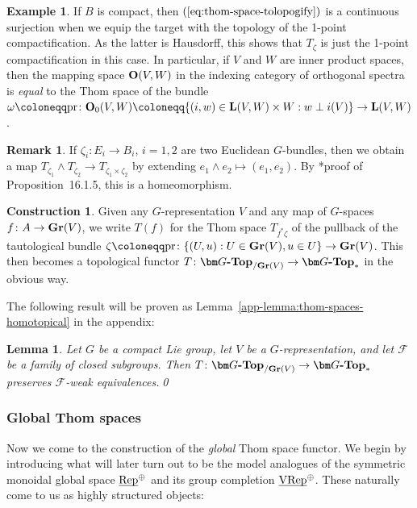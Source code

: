 \documentclass[reqno]{memo-l}
\theoremstyle{mythm}
\newtheorem{lemma}[thm]{Lemma}
\theoremstyle{definition}
\newtheorem{rk}[thm]{Remark}
\newtheorem{constr}[thm]{Construction}
\newtheorem{ex}[thm]{Example}
\numberwithin{equation}{section}
\newcommand{\Ff}{{\mathcal{F}}}
\newcommand{\cat}[1]{\textbf{\textup{#1}}}
\newcommand{\pr}{\textup{pr}}
\newcommand{\ulhelper}[2]{\underline{\setbox0=\hbox{$#1#2$}\dp0=0.4pt \box0\relax}}
\newcommand{\ul}[1]{{\mathpalette\ulhelper{#1}}\hbox{\rule[-2pt]{0pt}{0pt}}}
\let\smashp=\wedge
\newcommand{\VRep}{\textup{VRep}}
\newcommand{\Vect}{\textup{Rep}}
\begin{document}
\begin{ex}\label{ex:thom-space-1pt}
    If $B$ is compact, then $(\ref{eq:thom-space-tolopogify})$ is a continuous surjection when we equip the target with the topology of the 1-point compactification. As the latter is Hausdorff, this shows that $T_\zeta$ is just the 1-point compactification in this case. In particular, if $V$ and $W$ are inner product spaces, then the mapping space $\cat{O}(V,W)$ in the indexing category of orthogonal spectra is \emph{equal} to the Thom space of the bundle $\omega\coloneqq\pr\colon\cat{O}_0(V,W)\coloneqq\{(i,w)\in\cat{L}(V,W)\times W: w\perp i(V)\}\to\cat{L}(V,W)$.
\end{ex}

\begin{rk}\label{rk:classical-thom-sym-mon}
    If $\zeta_i\colon E_i\to B_i$, $i=1,2$ are two Euclidean $G$-bundles, then we obtain a map $T_{\zeta_1}\smashp T_{\zeta_2}\to T_{\zeta_1\times\zeta_2}$ by extending $e_1\smashp e_2\mapsto (e_1,e_2)$. By \cite{husemoller}*{proof of Proposition~16.1.5}, this is a homeomorphism. 
\end{rk}

\begin{constr}\label{constr:thom-over-Gr}
    Given any $G$-representation $V$ and any map of $G$-spaces $f\colon A\to\cat{Gr}(V)$, we write $T(f)$ for the Thom space $T_{f^*\zeta}$ of the pullback of the tautological bundle $\zeta\coloneqq\pr\colon \{(U,u) : U\in\cat{Gr}(V),u\in U\}\to\cat{Gr}(V)$. This then becomes a topological functor $T\colon\cat{$\bm G$-Top}_{/\cat{Gr}(V)}\to\cat{$\bm G$-Top}_*$ in the obvious way.
\end{constr}

The following result will be proven as Lemma~\ref{app-lemma:thom-spaces-homotopical} in the appendix:

\begin{lemma}\label{lemma:classical-thom-homotopical}
    Let $G$ be a compact Lie group, let $V$ be a $G$-representation, and let $\Ff$ be a family of closed subgroups. Then $T\colon\cat{$\bm G$-Top}_{/\cat{Gr}(V)}\to\cat{$\bm G$-Top}_*$ preserves $\Ff$-weak equivalences.\qed
\end{lemma}

\subsubsection{Global Thom spaces} Now we come to the construction of the \emph{global} Thom space functor. We begin by introducing what will later turn out to be the model analogues of the symmetric monoidal global space $\ul\Vect^\oplus$ and its group completion $\ul\VRep^{\oplus}$. These naturally come to us as highly structured objects:
\end{document}
